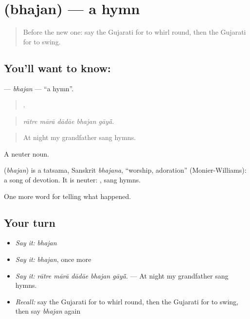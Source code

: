 \section[\texorpdfstring{\gu{ભજન} (bhajan)}{ભજન (bhajan)}]{ (bhajan) — a hymn}

\label{lesson:GU-C330-bhajan}



\begin{quote}
Before the new one: say the Gujarati for to whirl round, then the Gujarati for to swing.
\end{quote}

\subsection*{You'll want to know: }
\textbf{} — \emph{bhajan} — \textquotedblleft{}a hymn\textquotedblright{}.

\begin{quote}
    .
\end{quote}

\begin{quote}
\emph{rātre mārā dādāe bhajan gāyā̃.}
\end{quote}

\begin{quote}
At night my grandfather sang hymns.
\end{quote}

A neuter noun.

\begin{cousinweb}
\textbf{} (\emph{bhajan}) is a tatsama, Sanskrit \emph{bhajana}, \textquotedblleft{}worship, adoration\textquotedblright{} (Monier-Williams): a song of devotion. It is neuter: \textbf{ }, sang hymns.
\end{cousinweb}

\begin{grammarlens}[title={What you've built}]
One more word for telling what happened.
\end{grammarlens}

\subsection*{Your turn}
\begin{itemize}
\raggedright
  \item \emph{Say it:} \emph{bhajan}
  \item \emph{Say it:} \emph{bhajan}, once more
  \item \emph{Say it:} \emph{rātre mārā dādāe bhajan gāyā̃.} — At night my grandfather sang hymns.
  \item \emph{Recall:} say the Gujarati for to whirl round, then the Gujarati for to swing, then say \emph{bhajan} again
\end{itemize}

